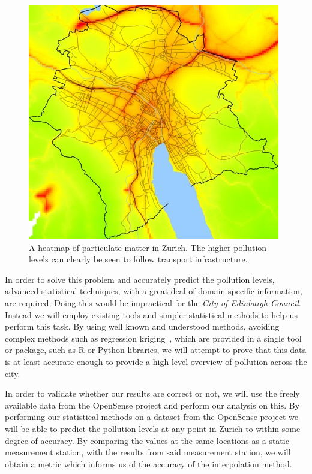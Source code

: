 	\begin{figure}[H]
	    \begin{center}
	        \includegraphics[width=\textwidth]{./images/zurichpm.jpg}
	        \caption{A heatmap of particulate matter in Zurich. The higher pollution levels can clearly be seen to follow transport infrastructure.~\cite{opensensezurich}}
	        \label{fig:zurichheatmap}
	    \end{center}
	\end{figure}

	
	In order to solve this problem and accurately predict the pollution levels, advanced statistical techniques, with a great deal of domain specific information, are required. Doing this would be impractical for the \emph{City of Edinburgh Council}. Instead we will employ existing tools and simpler statistical methods to help us perform this task. By using well known and understood methods, avoiding complex methods such as regression kriging~\cite{regressionkriging}, which are provided in a single tool or package, such as R or Python libraries, we will attempt to prove that this data is at least accurate enough to provide a high level overview of pollution across the city. 

	In order to validate whether our results are correct or not, we will use the freely available data from the OpenSense project and perform our analysis on this. By performing our statistical methods on a dataset from the OpenSense project we will be able to predict the pollution levels at any point in Zurich to within some degree of accuracy. By comparing the values at the same locations as a static measurement station, with the results from said measurement station, we will obtain a metric which informs us of the accuracy of the interpolation method.


